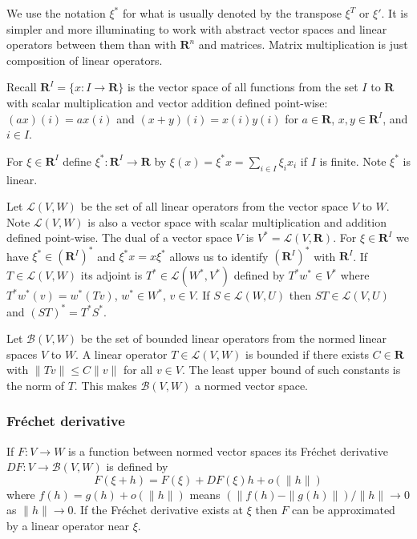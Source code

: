 We use the notation \(\xi^*\) for what is usually denoted by the
transpose \(\xi^T\) or \(\xi'\). It is simpler and more illuminating to
work with abstract vector spaces and linear operators between them than
with \(\mathbf{R}^n\) and matrices. Matrix multiplication is just
composition of linear operators.

Recall \(\mathbf{R}^I = \{x\colon I\to\mathbf{R}\}\) is the vector space
of all functions from the set \(I\) to \(\mathbf{R}\) with scalar
multiplication and vector addition defined point-wise:
\({(ax)(i) = ax(i)}\) and \({(x + y)(i) = x(i) y(i)}\) for
\(a\in\mathbf{R}\), \({x,y\in\mathbf{R}^I}\), and \(i\in I\).

For \(\xi\in\mathbf{R}^I\) define
\(\xi^*\colon\mathbf{R}^I\to\mathbf{R}\) by
\(\xi(x) = \xi^*x = \sum_{i\in I} \xi_i x_i\) if \(I\) is finite. Note
\(\xi^*\) is linear.

Let \(\mathcal{L}(V,W)\) be the set of all linear operators from the
vector space \(V\) to \(W\). Note \(\mathcal{L}(V,W)\) is also a vector
space with scalar multiplication and addition defined point-wise. The
dual of a vector space \(V\) is \(V^*=\mathcal{L}(V,\mathbf{R})\). For
\(\xi\in\mathbf{R}^I\) we have \(\xi^*\in (\mathbf{R}^I)^*\) and
\(\xi^*x = x\xi^*\) allows us to identify \((\mathbf{R}^I)^*\) with
\(\mathbf{R}^I\). If \(T\in\mathcal{L}(V,W)\) its adjoint is
\(T^*\in\mathcal{L}(W^*,V^*)\) defined by \(T^*w^*\in V^*\) where
\(T^*w^*(v) = w^*(Tv)\), \(w^*\in W^*\), \(v\in V\). If
\(S\in\mathcal{L}(W,U)\) then \(ST\in\mathcal{L}(V,U)\) and
\((ST)^* = T^*S^*\).

Let \(\mathcal{B}(V,W)\) be the set of bounded linear operators from the
normed linear spaces \(V\) to \(W\). A linear operator
\(T\in\mathcal{L}(V,W)\) is bounded if there exists \(C\in\mathbf{R}\)
with \(\|Tv\| \le C\|v\|\) for all \(v\in V\). The least upper bound of
such constants is the norm of \(T\). This makes \(\mathcal{B}(V,W)\) a
normed vector space.

\subsubsection{Fréchet derivative}\label{fruxe9chet-derivative}

If \(F\colon V\to W\) is a function between normed vector spaces its
Fréchet derivative \({DF\colon V\to \mathcal{B}(V,W)}\) is defined by \[
    F(\xi + h) = F(\xi) + DF(\xi)h + o(\|h\|)
\] where \(f(h) = g(h) + o(\|h\|)\) means
\((\|f(h) - \|g(h)\|)/\|h\|\to 0\) as \(\|h\|\to 0\). If the Fréchet
derivative exists at \(\xi\) then \(F\) can be approximated by a linear
operator near \(\xi\).

